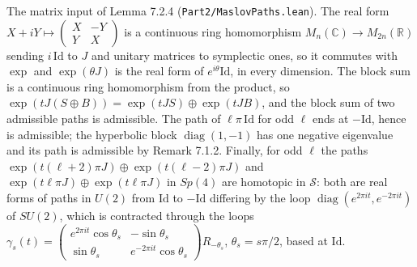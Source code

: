 \begin{lemma}
  \label{lem:maslov-paths}
  \leanok
  The matrix input of Lemma 7.2.4 (\texttt{Part2/MaslovPaths.lean}).  The real
  form $X + iY \mapsto \begin{pmatrix} X & -Y \\ Y & X\end{pmatrix}$ is a continuous
  ring homomorphism $M_n(\mathbb{C}) \to M_{2n}(\mathbb{R})$ sending $i\,\mathrm{Id}$
  to $J$ and unitary matrices to symplectic ones, so it commutes with $\exp$ and
  $\exp(\theta J)$ is the real form of $e^{i\theta}\mathrm{Id}$, in every
  dimension.  The block sum is a continuous ring homomorphism from the product,
  so $\exp(tJ(S\oplus B)) = \exp(tJS) \oplus \exp(tJB)$, and the block sum of
  two admissible paths is admissible.  The path of $\ell\pi\,\mathrm{Id}$ for odd
  $\ell$ ends at $-\mathrm{Id}$, hence is admissible; the hyperbolic block
  $\operatorname{diag}(1,-1)$ has one negative eigenvalue and its path is admissible
  by Remark 7.1.2.  Finally, for odd $\ell$ the paths
  $\exp(t(\ell+2)\pi J) \oplus \exp(t(\ell-2)\pi J)$ and
  $\exp(t\ell\pi J) \oplus \exp(t\ell\pi J)$ in $Sp(4)$ are homotopic in
  $\mathcal{S}$: both are real forms of paths in $U(2)$ from $\mathrm{Id}$ to
  $-\mathrm{Id}$ differing by the loop $\operatorname{diag}(e^{2\pi it},
  e^{-2\pi it})$ of $SU(2)$, which is contracted through the loops
  $\gamma_s(t) = \begin{pmatrix} e^{2\pi it}\cos\theta_s & -\sin\theta_s \\
  \sin\theta_s & e^{-2\pi it}\cos\theta_s\end{pmatrix} R_{-\theta_s}$,
  $\theta_s = s\pi/2$, based at $\mathrm{Id}$.
\end{lemma}

